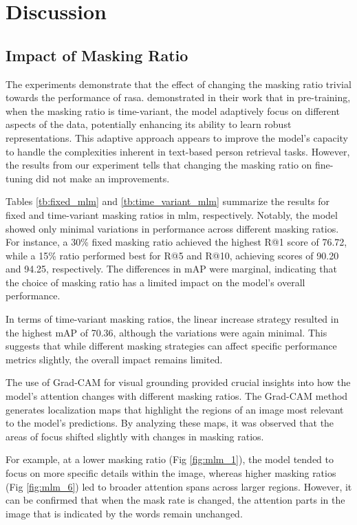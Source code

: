 \section{Discussion}
\subsection{Impact of Masking Ratio}

The experiments demonstrate that the effect of changing the masking ratio trivial towards the performance of \acrshort{rasa}. \cite{yang2023learningbettermaskingbetter} demonstrated in their work that in pre-training, when the masking ratio is time-variant, the model adaptively focus on different aspects of the data, potentially enhancing its ability to learn robust representations. This adaptive approach appears to improve the model's capacity to handle the complexities inherent in text-based person retrieval tasks. However, the results from our experiment tells that changing the masking ratio on fine-tuning did not make an improvements. 

Tables \ref{tb:fixed_mlm} and \ref{tb:time_variant_mlm} summarize the results for fixed and time-variant masking ratios in \acrshort{mlm}, respectively. Notably, the model showed only minimal variations in performance across different masking ratios. For instance, a 30\% fixed masking ratio achieved the highest R@1 score of 76.72, while a 15\% ratio performed best for R@5 and R@10, achieving scores of 90.20 and 94.25, respectively. The differences in mAP were marginal, indicating that the choice of masking ratio has a limited impact on the model's overall performance.

In terms of time-variant masking ratios, the linear increase strategy resulted in the highest mAP of 70.36, although the variations were again minimal. This suggests that while different masking strategies can affect specific performance metrics slightly, the overall impact remains limited.

The use of Grad-CAM for visual grounding provided crucial insights into how the model's attention changes with different masking ratios. The Grad-CAM method generates localization maps that highlight the regions of an image most relevant to the model's predictions. By analyzing these maps, it was observed that the areas of focus shifted slightly with changes in masking ratios.

For example, at a lower masking ratio (Fig \ref{fig:mlm_1}), the model tended to focus on more specific details within the image, whereas higher masking ratios (Fig \ref{fig:mlm_6}) led to broader attention spans across larger regions. However, it can be confirmed that when the mask rate is changed, the attention parts in the image that is  indicated by the words remain unchanged.

